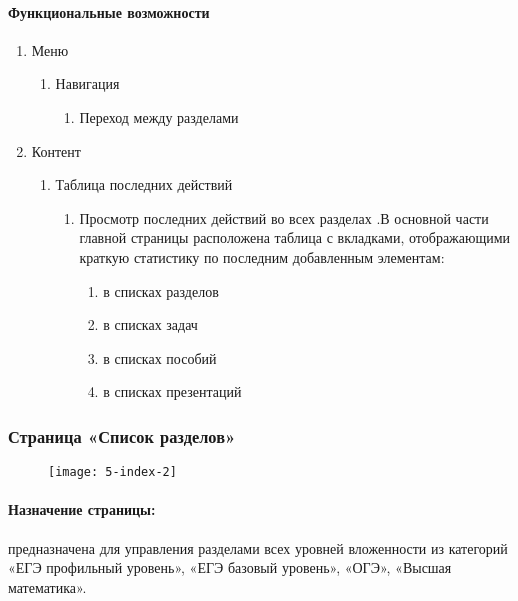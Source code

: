 \paragraph{Функциональные возможности}
\begin{enumerate}
	\item Меню
	\begin{enumerate}
		\item Навигация
		\begin{enumerate}
			\item Переход между разделами
		\end{enumerate}
	\end{enumerate}

	\item Контент
	\begin{enumerate}
		\item Таблица последних действий
		\begin{enumerate}
			\item Просмотр последних действий во всех разделах .В основной части главной страницы расположена таблица с вкладками, отображающими краткую статистику по последним добавленным элементам:
			\begin{enumerate}
				\item  в списках разделов
				\item  в списках задач
				\item  в списках пособий
				\item  в списках презентаций
			\end{enumerate}
		\end{enumerate}
	\end{enumerate}
\end{enumerate}

\subsubsection{Страница «Список разделов»}
\begin{figure}[H]
\texttt{[image: 5-index-2]}
\end{figure}
\paragraph{Назначение страницы:} предназначена для управления разделами всех уровней вложенности из категорий «ЕГЭ профильный уровень», «ЕГЭ базовый уровень», «ОГЭ», «Высшая математика».

